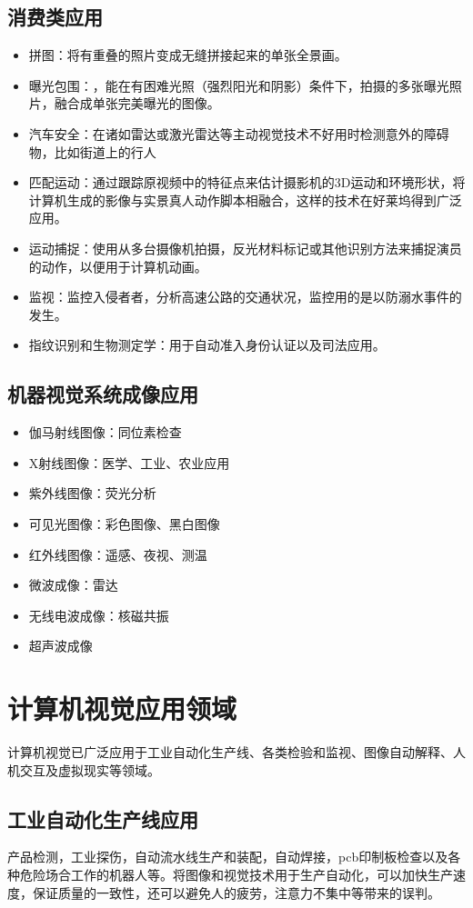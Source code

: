{\begin{itemize}
\end{itemize}

\subsection{消费类应用}
\begin{itemize}
\item 拼图：将有重叠的照片变成无缝拼接起来的单张全景画。
\item 曝光包围：，能在有困难光照（强烈阳光和阴影）条件下，拍摄的多张曝光照片，融合成单张完美曝光的图像。
\item 汽车安全：在诸如雷达或激光雷达等主动视觉技术不好用时检测意外的障碍物，比如街道上的行人
\item 匹配运动：通过跟踪原视频中的特征点来估计摄影机的3D运动和环境形状，将计算机生成的影像与实景真人动作脚本相融合，这样的技术在好莱坞得到广泛应用。
\item 运动捕捉：使用从多台摄像机拍摄，反光材料标记或其他识别方法来捕捉演员的动作，以便用于计算机动画。
\item 监视：监控入侵者者，分析高速公路的交通状况，监控用的是以防溺水事件的发生。
\item 指纹识别和生物测定学：用于自动准入身份认证以及司法应用。
\end{itemize}


\subsection{机器视觉系统成像应用}
\begin{itemize}
\item 伽马射线图像：同位素检查
\item X射线图像：医学、工业、农业应用
\item 紫外线图像：荧光分析
\item 可见光图像：彩色图像、黑白图像
\item 红外线图像：遥感、夜视、测温
\item 微波成像：雷达
\item 无线电波成像：核磁共振
\item 超声波成像
\end{itemize}

\section{计算机视觉应用领域}
计算机视觉已广泛应用于工业自动化生产线、各类检验和监视\citep{.2015,.2016b}、图像自动解释、人机交互\citep{.2018k}及虚拟现实等领域。
\subsection{工业自动化生产线应用}
产品检测\citep{.2017}，工业探伤\citep{.d}，自动流水线生产和装配，自动焊接，pcb印制板检查以及各种危险场合工作的机器人等。将图像和视觉技术用于生产自动化，可以加快生产速度\citep{.2017e}，保证质量的一致性，还可以避免人的疲劳，注意力不集中等带来的误判\citep{.2017d}。
}
